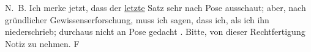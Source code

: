 \pstart
           N. B. Ich merke jetzt, dass der \uline{letzte} Satz sehr
                  nach Pose ausschaut; aber, nach gründlicher Gewissenserforschung, muss ich sagen,
                  dass ich, als ich ihn niederschrieb; durchaus nicht an Pose gedacht \label{T_L00326-1v}\label{T_L00326-1}. Bitte, von dieser
                  Rechtfertigung Notiz zu nehmen. \spacefill\mbox{F}\pend
           \endnumbering{}  \newcommand{\dateiname}{L00326}\newcommand{\titel}{Friedrich M. Fels an Arthur Schnitzler, [17. 5. 1894]}\newcommand{\editorInnen}{Martin Anton Müller und Gerd-Hermann Susen}
